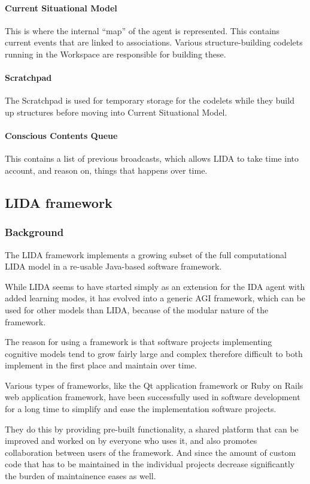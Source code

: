\paragraph{Current Situational Model} This is where the internal ``map'' of the agent is represented. This contains current events that are linked to associations. Various structure-building codelets running in the Workspace are responsible for building these.
\paragraph{Scratchpad} The Scratchpad is used for temporary storage for the codelets while they build up structures before moving into Current Situational Model.
\paragraph{Conscious Contents Queue} This contains a list of previous broadcasts, which allows LIDA to take time into account, and reason on, things that happens over time.

\subsection{LIDA framework}
\subsubsection{Background}
The LIDA framework implements a growing subset of the full computational LIDA model in a re-usable Java-based software framework.

While LIDA seems to have started simply as an extension for the IDA agent with added learning modes\cite{franklin2007lida}, it has evolved into a generic AGI framework, which can be used for other models than LIDA, because of the modular nature of the framework.\cite{snaider2011lida}

The reason for using a framework is that software projects implementing cognitive models tend to grow fairly large and complex therefore difficult to both implement in the first place and maintain over time.

Various types of frameworks, like the Qt application framework or Ruby on Rails web application framework, have been successfully used in software development for a long time to simplify and ease the implementation software projects\cite{bachle2007rails}.

They do this by providing pre-built functionality, a shared platform that can be improved and worked on by everyone who uses it, and also promotes collaboration between users of the framework. And since the amount of custom code that has to be maintained in the individual projects decrease significantly the burden of maintainence eases as well.\cite{snaider2012lida}

